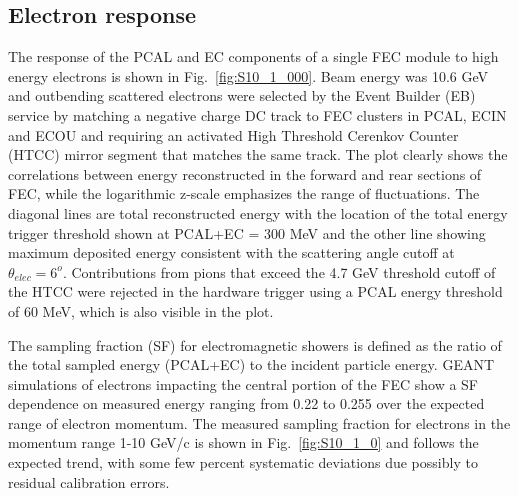 \subsection{Electron response}
The response of the PCAL and EC components of a single FEC module to high energy electrons is shown in Fig.~\ref{fig:S10_1_000}.  Beam energy was 10.6 GeV and outbending scattered electrons were selected by the Event Builder (EB) service by matching a negative charge DC track to FEC clusters in PCAL, ECIN and ECOU and requiring an activated High Threshold Cerenkov Counter (HTCC) mirror segment that matches the same track.  The plot clearly shows the correlations between energy reconstructed in the forward and rear sections of FEC, while the logarithmic z-scale emphasizes the range of fluctuations. The diagonal lines are total reconstructed  energy with the location of the total energy trigger threshold shown at PCAL+EC = 300 MeV and the other line showing maximum deposited energy consistent with the scattering angle cutoff at $\theta_{elec}=6^o$. Contributions from pions that exceed the 4.7 GeV threshold cutoff of the HTCC were rejected in the hardware trigger using a PCAL energy threshold of 60 MeV, which is also visible in the plot.

The sampling fraction (SF) for electromagnetic showers is defined as the ratio of the total sampled energy (PCAL+EC) to the incident particle energy.  GEANT simulations of electrons impacting the central portion of the FEC show a SF dependence on measured energy ranging from 0.22 to 0.255 over the expected range of electron momentum.  The measured sampling fraction for electrons in the momentum range 1-10 GeV/c is shown in Fig.~\ref{fig:S10_1_0} and follows the expected trend, with some few percent systematic deviations due possibly to residual calibration errors.

